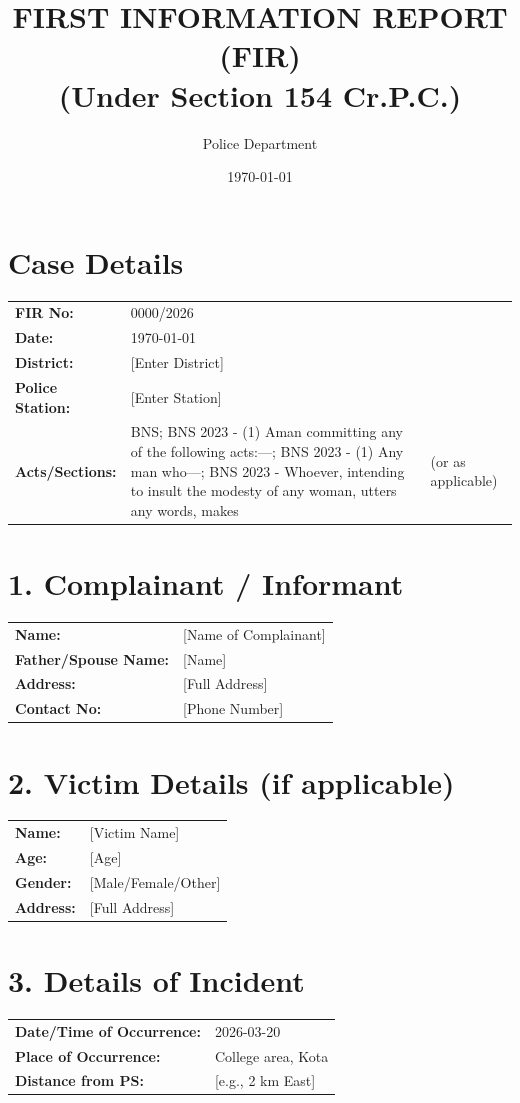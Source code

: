 \documentclass[11pt, a4paper]{article}
\title{\textbf{FIRST INFORMATION REPORT (FIR)}\\ \large (Under Section 154 Cr.P.C.)}
\author{Police Department}
\date{\today}
\begin{document}
\maketitle
\onehalfspacing

\section{Case Details}
\begin{tabular}{llp{8cm}}
  \textbf{FIR No:} & 0000/2026 & \\
  \textbf{Date:} & \today & \\
  \textbf{District:} & [Enter District] & \\
  \textbf{Police Station:} & [Enter Station] & \\
  \textbf{Acts/Sections:} & BNS; BNS 2023 - (1) Aman committing any of the following acts:—; BNS 2023 - (1) Any man who—; BNS 2023 - Whoever, intending to insult the modesty of any woman, utters any words, makes & (or as applicable) \\
\end{tabular}

\section{1. Complainant / Informant}
\begin{tabular}{ll}
  \textbf{Name:} & [Name of Complainant] \\
  \textbf{Father/Spouse Name:} & [Name] \\
  \textbf{Address:} & [Full Address] \\
  \textbf{Contact No:} & [Phone Number] \\
\end{tabular}

\section{2. Victim Details (if applicable)}
\begin{tabular}{ll}
  \textbf{Name:} & [Victim Name] \\
  \textbf{Age:} & [Age] \\
  \textbf{Gender:} & [Male/Female/Other] \\
  \textbf{Address:} & [Full Address] \\
\end{tabular}

\section{3. Details of Incident}
\begin{tabular}{ll}
  \textbf{Date/Time of Occurrence:} & 2026-03-20 \\
  \textbf{Place of Occurrence:} & College area, Kota \\
  \textbf{Distance from PS:} & [e.g., 2 km East] \\
\end{tabular}
\end{document}
